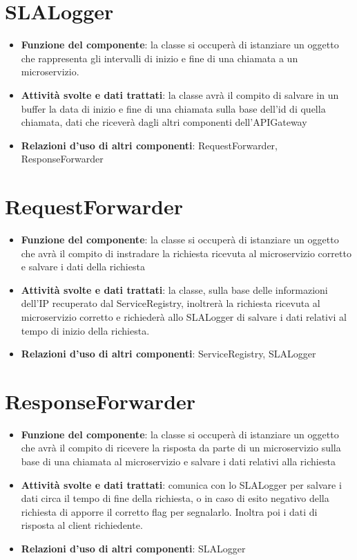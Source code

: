 \chapter{SLALogger}
\begin{itemize}
	\item \textbf{Funzione del componente}: la classe si occuper\`{a} di istanziare un oggetto che rappresenta gli intervalli di inizio e fine di una chiamata a un microservizio.
	\item \textbf{Attivit\`{a} svolte e dati trattati}:  la classe avr\`{a} il compito di salvare in un buffer la data di inizio e fine di una chiamata sulla base dell'id di quella chiamata, dati che ricever\`{a} dagli altri componenti dell'APIGateway
	\item \textbf{Relazioni d'uso di altri componenti}: RequestForwarder, ResponseForwarder
\end{itemize}

\chapter{RequestForwarder}
\begin{itemize}
	\item \textbf{Funzione del componente}: la classe si occuper\`{a} di istanziare un oggetto che avr\`{a} il compito di instradare la richiesta ricevuta al microservizio corretto e salvare i dati della richiesta
	\item \textbf{Attivit\`{a} svolte e dati trattati}: la classe, sulla base delle informazioni dell'IP recuperato dal ServiceRegistry, inoltrer\`{a} la richiesta ricevuta al microservizio corretto e richieder\`{a} allo SLALogger di salvare i dati relativi al tempo di inizio della richiesta.
	\item \textbf{Relazioni d'uso di altri componenti}: ServiceRegistry, SLALogger
\end{itemize}

\chapter{ResponseForwarder}
\begin{itemize}
	\item \textbf{Funzione del componente}: la classe si occuper\`{a} di istanziare un oggetto che avr\`{a} il compito di ricevere la risposta da parte di un microservizio sulla base di una chiamata al microservizio e salvare i dati relativi alla richiesta
	\item \textbf{Attivit\`{a} svolte e dati trattati}: comunica con lo SLALogger per salvare i dati circa il tempo di fine della richiesta, o in caso di esito negativo della richiesta di apporre il corretto flag per segnalarlo. Inoltra poi i dati di risposta al client richiedente.
	\item \textbf{Relazioni d'uso di altri componenti}: SLALogger
\end{itemize}


